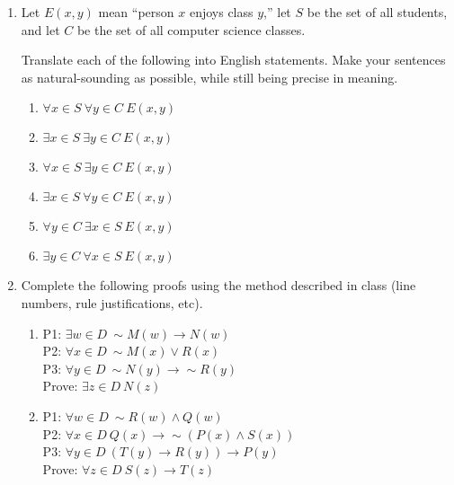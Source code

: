 \documentclass[12pt, letterpaper]{report}
\newcommand{\nott}{{\sim}}
\begin{document}
\begin{enumerate}
               
               
               \newpage
        \item Let $E(x,y)$ mean ``person $x$ enjoys class $y$,'' let $S$ be the set of
        all students, and let $C$ be the set of all computer science classes.
        
        Translate each of the following into English statements.  Make your sentences as natural-sounding
        as possible, while still being precise in meaning.
        
        \begin{enumerate}
                \item $\forall x \in S \  \forall y \in C \  E(x, y)$
                \item $\exists x \in S \  \exists y \in C \  E(x, y)$
                \item $\forall x \in S \  \exists y \in C \  E(x, y)$
                \item $\exists x \in S \  \forall y \in C \  E(x, y)$
                \item $\forall y \in C \  \exists x \in S \  E(x, y)$
                \item $\exists y \in C \  \forall x \in S \  E(x, y)$
                
        \end{enumerate}

\item Complete the following proofs using the method described in class (line numbers, 
rule justifications, etc).

\begin{enumerate}

\item P1: $\exists w \in D \ \nott M(w) \to N(w)$ \\
        P2: $\forall x \in D \ \nott M(x) \lor R(x)$ \\
        P3: $\forall y \in D \ \nott N(y) \to \nott R(y)$ \\
        Prove: $\exists z \in D \ N(z)$
        
\item P1: $\forall w \in D \ \nott R(w) \land Q(w)$ \\
        P2: $\forall x \in D \ Q(x) \to \nott (P(x) \land S(x))$ \\
        P3: $\forall y \in D \ (T(y) \to R(y)) \to P(y)$ \\
        Prove: $\forall z \in D \ S(z) \to T(z)$
        

\end{enumerate}
\end{enumerate}
\end{document}
